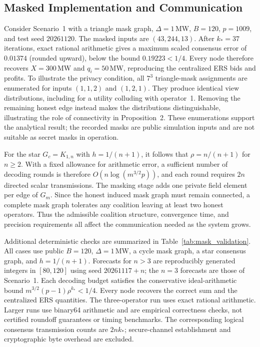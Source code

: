\documentclass[journal]{IEEEtran}
\begin{document}
\subsection{Masked Implementation and Communication}

Consider Scenario~1 with a triangle mask graph, $\Delta=1$\,MW, $B=120$, $p=1009$, and test seed $20261120$. The masked inputs are $(43,244,13)$. After $k_*=37$ iterations, exact rational arithmetic gives a maximum scaled consensus error of $0.01374$ (rounded upward), below the bound $0.19223<1/4$. Every node therefore recovers $X=300$\,MW and $q_i=50$\,MW, reproducing the centralized ERS bids and profits. To illustrate the privacy condition, all $7^3$ triangle-mask assignments are enumerated for inputs $(1,1,2)$ and $(1,2,1)$. They produce identical view distributions, including for a utility colluding with operator~1. Removing the remaining honest edge instead makes the distributions distinguishable, illustrating the role of connectivity in Proposition~2. These enumerations support the analytical result; the recorded masks are public simulation inputs and are not suitable as secret masks in operation.

For the star $G_c=K_{1,n}$ with $h=1/(n+1)$, it follows that $\rho=n/(n+1)$ for $n\geq2$. With a fixed allowance for arithmetic error, a sufficient number of decoding rounds is therefore $O(n\log(m^{3/2}p))$, and each round requires $2n$ directed scalar transmissions. The masking stage adds one private field element per edge of $G_m$. Since the honest induced mask graph must remain connected, a complete mask graph tolerates any coalition leaving at least two honest operators. Thus the admissible coalition structure, convergence time, and precision requirements all affect the communication needed as the system grows.

Additional deterministic checks are summarized in Table~\ref{tab:mask_validation}. All cases use public $B=120$, $\Delta=1$\,MW, a cycle mask graph, a star consensus graph, and $h=1/(n+1)$. Forecasts for $n>3$ are reproducibly generated integers in $[80,120]$ using seed $20261117+n$; the $n=3$ forecasts are those of Scenario~1. Each decoding budget satisfies the conservative ideal-arithmetic bound $m^{3/2}(p-1)\rho^{k_*}<1/4$. Every node recovers the correct sum and the centralized ERS quantities. The three-operator run uses exact rational arithmetic. Larger runs use binary64 arithmetic and are empirical correctness checks, not certified roundoff guarantees or timing benchmarks. The corresponding logical consensus transmission counts are $2nk_*$; secure-channel establishment and cryptographic byte overhead are excluded.
\end{document}
